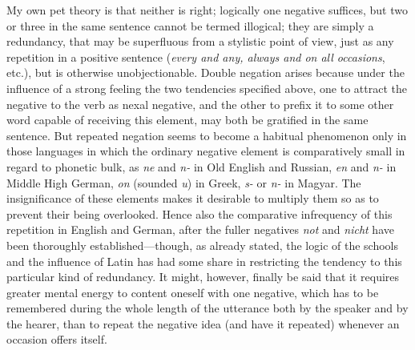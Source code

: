 My own pet theory is that neither is right; logically one negative suffices, but two or three in the same sentence cannot be termed illogical; they are simply a redundancy, that may be superfluous from a stylistic point of view, just as any repetition in a positive sentence (\textit{every and any, always and on all occasions}, etc.), but is otherwise unobjectionable. Double negation arises because under the influence of a strong feeling the two tendencies specified above, one to attract the negative to the verb as nexal negative, and the other to prefix it to some other word capable of receiving this element, may both be gratified in the same sentence. But repeated negation seems to become a habitual phenomenon only in those languages in which the ordinary negative element is comparatively small in regard to phonetic bulk, as \textit{ne} and \textit{n-} in Old English and Russian, \textit{en} and \textit{n-} in Middle High German, \textit{on} (sounded \textit{u}) in Greek, \textit{s-} or \textit{n-} in Magyar. The insignificance of these elements makes it desirable to multiply them so as to prevent their being overlooked. Hence also the comparative infrequency of this repetition in English and German, after the fuller negatives \textit{not} and \textit{nicht} have been thoroughly established---though, as already stated, the logic of the schools and the influence of Latin has had some share in restricting the tendency to this particular kind of redundancy. It might, however, finally be said that it requires greater mental energy to content oneself with one negative, which has to be remembered during the whole length of the utterance both by the speaker and by the hearer, than to repeat the negative idea (and have it repeated) whenever an occasion offers itself.


